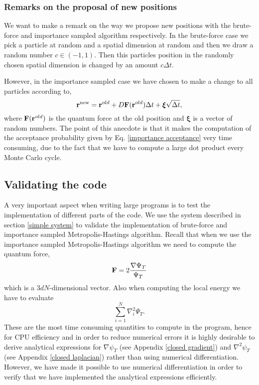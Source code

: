 \documentclass[a4paper,10pt]{article}
\begin{document}
\subsubsection{Remarks on the proposal of new positions} \label{remarks}
We want to make a remark on the way we propose new positions with the brute-force and importance sampled algorithm respectively. In the
brute-force case we pick a particle at random and a spatial dimension at random and then we draw a random number $c \in (-1,1)$. Then
this particles position in the randomly chosen spatial dimension is changed by an amount $c\Delta t$.

However, in the importance sampled case we have chosen to make a change to all particles according to, 
\begin{equation}
 {\bf r}^{\text{new}} = {\bf r}^{old} + D{\bf F }({\bf r}^{old})\Delta t + {\bm \xi} \sqrt{\Delta t},
\end{equation}
where ${\bf F}({\bf r}^{old})$ is the quantum force at the old position and ${\bm \xi}$ is a vector of random numbers. The point of this
anecdote is that it makes the computation of the acceptance probability given by Eq. \ref{importance acceptance} very time consuming, due to the fact that we have to compute a large dot
product every Monte Carlo cycle.
\subsection{Validating the code} \label{Validation section}
A very important aspect when writing large programs is to test the implementation of different parts of the code. We use 
the system described in section \ref{simple system} to validate the implementation of brute-force and importance sampled Metropolis-Hastings
algorithm.
Recall that when we use the importance sampled Metropolis-Hastings algorithm we need to compute the quantum force,
\begin{equation*}
 {\bf F} = 2\frac{\nabla \Psi_T}{\Psi_T}
\end{equation*}
which is a $3dN$-dimensional vector. Also when computing the local energy we have to evaluate 
\begin{equation*}
 \sum_{i=1}^N \nabla_i^2 \Psi_T.
\end{equation*}
These are the most time consuming quantities to compute in the program, hence for CPU efficiency and in order to reduce numerical errors it is highly desirable to derive analytical 
expressions for $\nabla \psi_T$ (see Appendix \ref{closed gradient}) and $\nabla^2 \psi_T$ (see Appendix \ref{closed laplacian}) 
rather than using numerical differentiation. However, we have made it possible to use numerical differentiation in order to verify that we have implemented the analytical expressions 
efficiently. 
\end{document}
